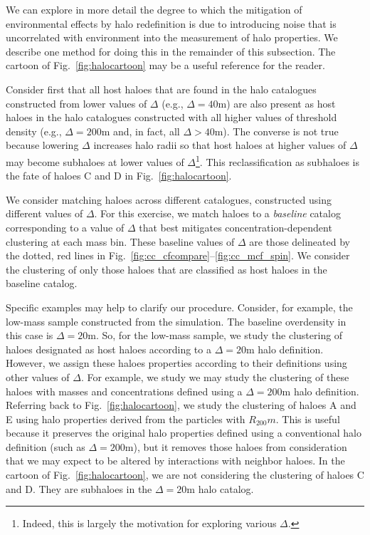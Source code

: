 \documentclass[usenatbib,fleqn]{mnras}
\begin{document}
We can explore in more detail the degree to which the mitigation of environmental effects by halo redefinition is due to introducing noise that is uncorrelated with environment into the measurement of halo properties. We describe one method for doing this in the remainder of this subsection. The cartoon of Fig.~\ref{fig:halocartoon} may be a useful reference for the reader. 

Consider first that all host haloes that are found in the halo catalogues constructed from lower values of $\Delta$ (e.g., $\Delta=40$m) are also present as host haloes in the halo catalogues constructed with all higher values of threshold density (e.g., $\Delta=200$m and, in fact, all $\Delta > 40$m). The converse is not true because lowering $\Delta$ increases halo radii so that host haloes at higher values of $\Delta$ may become subhaloes at lower values of $\Delta$\footnote{Indeed, this is largely the motivation for exploring various $\Delta$.}. This reclassification as subhaloes is the fate of haloes C and D in Fig.~\ref{fig:halocartoon}. 

We consider matching haloes across different catalogues, constructed using different values of $\Delta$. For this exercise, we match haloes to a {\em baseline} catalog corresponding to a value of $\Delta$ that best mitigates concentration-dependent clustering at each mass bin. These baseline values of $\Delta$ are those delineated by the dotted, red lines in Fig.~\ref{fig:cc_cfcompare}--\ref{fig:cc_mcf_spin}. We consider the clustering of only those haloes that are classified as host haloes in the baseline catalog. 

Specific examples may help to clarify our procedure. Consider, for example, the low-mass sample constructed from the \simA{} simulation. The baseline overdensity in this case is $\Delta=20$m. So, for the low-mass sample, we study the clustering of haloes designated as host haloes according to a $\Delta=20$m halo definition. However, we assign these haloes properties according to their definitions using other values of $\Delta$. For example, we study we may study the clustering of these haloes with masses and concentrations defined using a $\Delta=200$m halo definition. Referring back to Fig.~\ref{fig:halocartoon}, we study the clustering of haloes A and E using halo properties derived from the particles with $R_{200}m$. This is useful because it preserves the original halo properties defined using a conventional halo definition (such as $\Delta=200$m), but it removes those haloes from consideration that we may expect to be altered by interactions with neighbor haloes. In the cartoon of Fig.~\ref{fig:halocartoon}, we are not considering the clustering of haloes C and D. They are subhaloes in the $\Delta=20$m halo catalog. 
\end{document}
